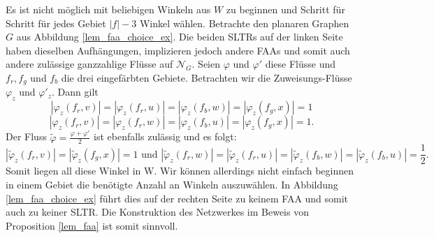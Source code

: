 \begin{example}
Es ist nicht möglich mit beliebigen Winkeln aus $W$ zu beginnen und Schritt für Schritt für jedes Gebiet $|f|-3$ Winkel wählen. Betrachte den planaren Graphen $G$ aus Abbildung \ref{lem_faa_choice_ex}. Die beiden SLTRs auf der linken Seite haben dieselben Aufhängungen, implizieren jedoch andere FAAs und somit auch andere zulässige ganzzahlige Flüsse auf $\mathcal{N}_G$. Seien $\varphi$ und $\varphi'$ diese Flüsse und $f_{r},f_{g}$ und $f_b$ die drei eingefärbten Gebiete. Betrachten wir die Zuweisungs-Flüsse $\varphi_z$ und $\varphi'_z$. Dann gilt $$|\varphi_z(f_r,v)|=|\varphi_z(f_r,u)|=|\varphi_z(f_b,w)| = |\varphi_z(f_g,x)| = 1$$
$$|\varphi_z(f_r,v)|=|\varphi_z(f_r,w)|=|\varphi_z(f_b,u)| = |\varphi_z(f_g,x)| = 1.$$
Der Fluss $\tilde{\varphi}=\frac{\varphi+\varphi'}{2}$ ist ebenfalls zulässig und es folgt:
$$|\tilde{\varphi}_z(f_r,v)|=|\tilde{\varphi}_z(f_g,x)| = 1 \text{ und } |\tilde{\varphi}_z(f_r,w)|=|\tilde{\varphi}_z(f_r,u)| = |\tilde{\varphi}_z(f_b,w)|=|\tilde{\varphi}_z(f_b,u)| = \frac{1}{2}.$$
Somit liegen all diese Winkel in W. Wir können allerdings nicht einfach beginnen in einem Gebiet die benötigte Anzahl an Winkeln auszuwählen. In Abbildung \ref{lem_faa_choice_ex} führt dies auf der rechten Seite zu keinem FAA und somit auch zu keiner SLTR. Die Konstruktion des Netzwerkes im Beweis von Proposition \ref{lem_faa} ist somit sinnvoll.


\end{example}
